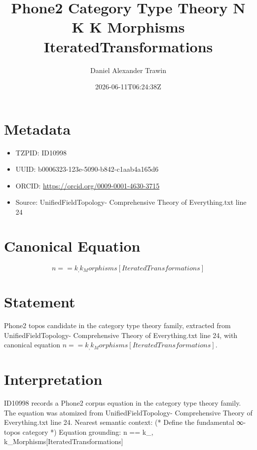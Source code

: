\documentclass[11pt]{article}
\title{Phone2 Category Type Theory N K K Morphisms IteratedTransformations}
\author{Daniel Alexander Trawin}
\date{2026-06-11T06:24:38Z}
\begin{document}
\maketitle
\section*{Metadata}
\begin{itemize}
\item TZPID: ID10998
\item UUID: b0006323-123e-5090-b842-c1aab4a165d6
\item ORCID: \url{https://orcid.org/0009-0001-4630-3715}
\item Source: UnifiedFieldTopology- Comprehensive Theory of Everything.txt line 24
\end{itemize}
\section*{Canonical Equation}
\[
n == k_, k_Morphisms[IteratedTransformations]
\]
\section*{Statement}
Phone2 topos candidate in the category type theory family, extracted from UnifiedFieldTopology- Comprehensive Theory of Everything.txt line 24, with canonical equation $n == k_, k_Morphisms[IteratedTransformations]$.
\section*{Interpretation}
ID10998 records a Phone2 corpus equation in the category type theory family. The equation was atomized from UnifiedFieldTopology- Comprehensive Theory of Everything.txt line 24. Nearest semantic context: (* Define the fundamental ∞-topos category *) Equation grounding: n == k_, k_Morphisms[IteratedTransformations]
\end{document}
